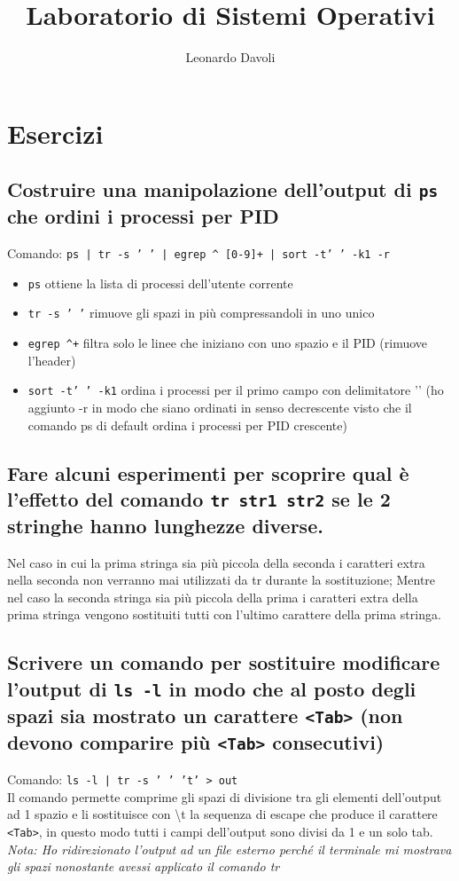 \documentclass{article}
\author{Leonardo Davoli}
\title{Laboratorio di Sistemi Operativi}
\begin{document}
\maketitle

\setcounter{section}{2} %
\section{Esercizi}

\subsection{Costruire una manipolazione dell'output di \texttt{ps} che ordini i processi per PID}
Comando: \texttt{ps | tr -s ' ' | egrep \^{} [0-9]+ | sort -t' ' -k1 -r}
\begin{itemize}
    \item \texttt{ps} ottiene la lista di processi dell'utente corrente
    \item \texttt{tr -s ' '} rimuove gli spazi in più compressandoli in uno unico
    \item \texttt{egrep \^{}\space[0-9]+} filtra solo le linee che iniziano con uno spazio e il PID (rimuove l'header)
    \item \texttt{sort -t' ' -k1} ordina i processi per il primo campo con delimitatore '\space' 
    (ho aggiunto -r in modo che siano ordinati in senso decrescente visto che il comando ps di default ordina i processi per PID crescente)
\end{itemize}

\subsection{Fare alcuni esperimenti per scoprire qual è l'effetto del comando 
\texttt{tr str1 str2} se le 2 stringhe hanno lunghezze diverse.}
Nel caso in cui la prima stringa sia più piccola della seconda i caratteri extra nella seconda non verranno 
mai utilizzati da tr durante la sostituzione; Mentre nel caso la seconda stringa sia più piccola della prima i caratteri extra della prima 
stringa vengono sostituiti tutti con l'ultimo carattere della prima stringa.

\subsection{Scrivere un comando per sostituire modificare l'output di \texttt{ls -l} 
in modo che al posto degli spazi sia mostrato un carattere \texttt{<Tab>} 
(non devono comparire più \texttt{<Tab>} consecutivi)}
Comando: \texttt{ls -l | tr -s ' ' 't' > out}\\
Il comando permette comprime gli spazi di divisione tra gli elementi dell'output ad 1 spazio e li sostituisce con \textbackslash t 
la sequenza di escape che produce il carattere \texttt{<Tab>}, in questo modo tutti i campi dell'output sono divisi da 1 e un solo tab.
\textit{Nota: Ho ridirezionato l'output ad un file esterno perché il terminale mi mostrava gli spazi nonostante avessi applicato il comando tr}
\end{document}
